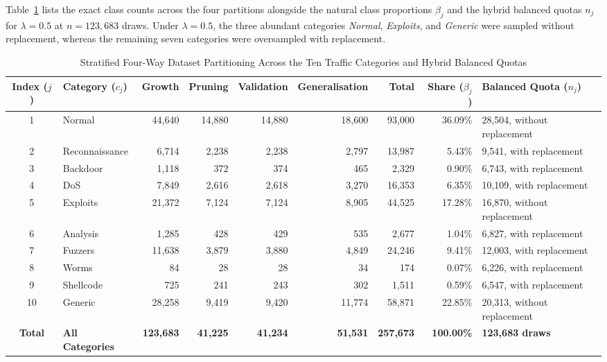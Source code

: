Table~\ref{tab:dataset_partitions} lists the exact class counts across the four partitions alongside the natural class proportions $\beta_j$ and the hybrid balanced quotas $n_j$ for $\lambda = 0.5$ at $n = 123{,}683$ draws. Under $\lambda = 0.5$, the three abundant categories \emph{Normal}, \emph{Exploits}, and \emph{Generic} were sampled without replacement, whereas the remaining seven categories were oversampled with replacement.

\begin{table}[!t]
\centering
\caption{Stratified Four-Way Dataset Partitioning Across the Ten Traffic Categories and Hybrid Balanced Quotas}
\label{tab:dataset_partitions}
\footnotesize
\setlength{\tabcolsep}{4.8pt}
\begin{tabular}{clrrrrrrl}
\toprule
\textbf{Index ($j$)} & \textbf{Category ($c_j$)} & \textbf{Growth} & \textbf{Pruning} & \textbf{Validation} & \textbf{Generalisation} & \textbf{Total} & \textbf{Share ($\beta_j$)} & \textbf{Balanced Quota ($n_j$)} \\
\midrule
1  & Normal         & 44,640 & 14,880 & 14,880 & 18,600 &  93,000 & 36.09\% & 28,504, without replacement \\
2  & Reconnaissance &  6,714 &  2,238 &  2,238 &  2,797 &  13,987 &  5.43\% &  9,541, with replacement \\
3  & Backdoor       &  1,118 &    372 &    374 &    465 &   2,329 &  0.90\% &  6,743, with replacement \\
4  & DoS            &  7,849 &  2,616 &  2,618 &  3,270 &  16,353 &  6.35\% & 10,109, with replacement \\
5  & Exploits       & 21,372 &  7,124 &  7,124 &  8,905 &  44,525 & 17.28\% & 16,870, without replacement \\
6  & Analysis       &  1,285 &    428 &    429 &    535 &   2,677 &  1.04\% &  6,827, with replacement \\
7  & Fuzzers        & 11,638 &  3,879 &  3,880 &  4,849 &  24,246 &  9.41\% & 12,003, with replacement \\
8  & Worms          &     84 &     28 &     28 &     34 &     174 &  0.07\% &  6,226, with replacement \\
9  & Shellcode      &    725 &    241 &    243 &    302 &   1,511 &  0.59\% &  6,547, with replacement \\
10 & Generic        & 28,258 &  9,419 &  9,420 & 11,774 &  58,871 & 22.85\% & 20,313, without replacement \\
\midrule
\textbf{Total} & \textbf{All Categories} & \textbf{123,683} & \textbf{41,225} & \textbf{41,234} & \textbf{51,531} & \textbf{257,673} & \textbf{100.00\%} & \textbf{123,683 draws} \\
\bottomrule
\end{tabular}
\end{table}

